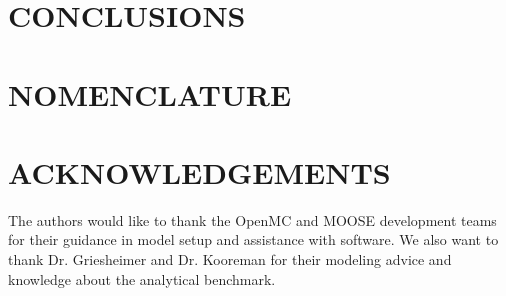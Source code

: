 \documentclass[letterpaper]{mc2023}
\begin{document}
\section{CONCLUSIONS}


\section*{NOMENCLATURE}

\printglossary[title={Nomenclature}, nonumberlist, nopostdot]

\section*{ACKNOWLEDGEMENTS}
The authors would like to thank the OpenMC and MOOSE development teams for their guidance in model setup and assistance
with software. We also want to thank Dr. Griesheimer and Dr. Kooreman for their modeling advice and knowledge about the
analytical benchmark.

\setlength{\baselineskip}{12pt}


\setlength{\baselineskip}{12pt}
\end{document}
